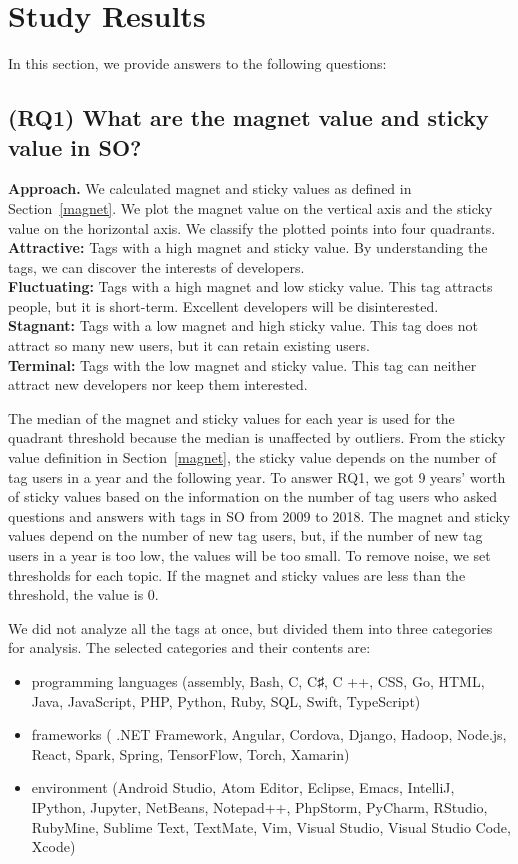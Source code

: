 \documentclass[conference]{IEEEtran}
\begin{document}
\section{Study Results} %
In this section, we provide answers to the following questions:
\subsection{(RQ1) What are the magnet value and sticky value in SO?}

\noindent
\textbf{Approach.}
We calculated magnet and sticky values as defined in Section~\ref{magnet}. We plot the magnet value on the vertical axis and the sticky value on the horizontal axis. We classify the plotted points into four quadrants.\\
\textbf{Attractive:} Tags with a high magnet and sticky value. By understanding the tags, we can discover the interests of developers.\\
\textbf{Fluctuating:} Tags with a high magnet and low sticky value. This tag attracts people, but it is short-term. Excellent developers will be disinterested.\\
\textbf{Stagnant:} Tags with a low magnet and high sticky value. This tag does not attract so many new users, but it can retain existing users.\\
\textbf{Terminal:} Tags with the low magnet and sticky value. This tag can neither attract new developers nor keep them interested.

The median of the magnet and sticky values for each year is used for the quadrant threshold because the median is unaffected by outliers. From the sticky value definition in Section~\ref{magnet}, the sticky value depends on the number of tag users in a year and the following year. To answer RQ1, we got 9 years’ worth of sticky values based on the information on the number of tag users who asked questions and answers with tags in SO from 2009 to 2018. The magnet and sticky values depend on the number of new tag users, but, if the number of new tag users in a year is too low, the values will be too small. To remove noise, we set thresholds for each topic. If the magnet and sticky values are less than the threshold, the value is 0.

We did not analyze all the tags at once, but divided them into three categories for analysis. The selected categories and their contents are:
\begin{itemize}
\item programming languages ​​(assembly, Bash, C, C♯, C ++, CSS, Go, HTML, Java, JavaScript, PHP, Python, Ruby, SQL, Swift, TypeScript)
\item frameworks ( .NET Framework, Angular, Cordova, Django, Hadoop, Node.js, React, Spark, Spring, TensorFlow, Torch, Xamarin)
\item environment (Android Studio, Atom Editor, Eclipse, Emacs, IntelliJ, IPython, Jupyter, NetBeans, Notepad++, PhpStorm, PyCharm, RStudio, RubyMine, Sublime Text, TextMate, Vim, Visual Studio, Visual Studio Code, Xcode)
\end{itemize}
\end{document}
